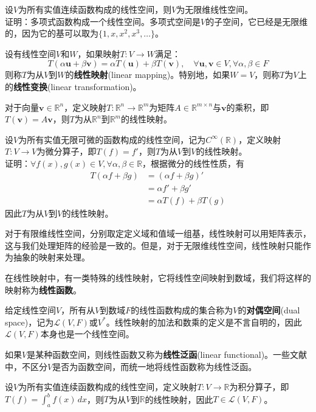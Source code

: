 \begin{example}
    设$V$为所有实值连续函数构成的线性空间，则$V$为无限维线性空间。\\
    证明：多项式函数构成一个线性空间。多项式空间是$V$的子空间，它已经是无限维的，因为它的基可以取为$\{1,x,x^2,x^3,\ldots\}$。
\end{example}

\begin{definition}[线性映射]
    设有线性空间$V$和$W$，如果映射$T:V\to W$满足：
    \[T(\alpha \mathbf{u}+\beta \mathbf{v})=\alpha T(\mathbf{u})+\beta T(\mathbf{v}),\quad\forall \mathbf{u},\mathbf{v}\in V,\forall \alpha,\beta\in F\]
    则称$T$为从$V$到$W$的\textbf{线性映射}(linear mapping)。特别地，如果$W=V$，则称$T$为$V$上的\textbf{线性变换}(linear transformation)。
\end{definition}

\begin{example}
    对于向量$\mathbf{v}\in\mathbb{R}^n$，定义映射$T:\mathbb{R}^n\to\mathbb{R}^m$为矩阵$A\in\mathbb{R}^{m\times n}$与$\mathbf{v}$的乘积，即$T(\mathbf{v})=A\mathbf{v}$，则$T$为从$\mathbb{R}^n$到$\mathbb{R}^m$的线性映射。
\end{example}

\begin{example}
    设$V$为所有实值无限可微的函数构成的线性空间，记为$C^\infty(\mathbb{R})$，定义映射$T:V\to V$为微分算子，即$T(f)=f'$，则$T$为从$V$到$V$的线性映射。\\
    证明：$\forall f(x),g(x)\in V,\forall \alpha,\beta\in \mathbb{R}$，根据微分的线性性质，有
    \begin{align*}
        T(\alpha f+\beta g)&=(\alpha f+\beta g)'\\
        &=\alpha f'+\beta g'\\
        &=\alpha T(f)+\beta T(g)
    \end{align*}
    因此$T$为从$V$到$V$的线性映射。
\end{example}

对于有限维线性空间，分别取定定义域和值域一组基，线性映射可以用矩阵表示，这与我们处理矩阵的经验是一致的。但是，对于无限维线性空间，线性映射只能作为抽象的映射来处理。

在线性映射中，有一类特殊的线性映射，它将线性空间映射到数域，我们将这样的映射称为\textbf{线性函数}。

\begin{definition}[对偶空间]
    给定线性空间$V$，所有从$V$到数域$F$的线性函数构成的集合称为$V$的\textbf{对偶空间}(dual space)，记为$\mathcal{L} (V,F)$或$V^*$。线性映射的加法和数乘的定义是不言自明的，因此$\mathcal{L} (V,F)$本身也是一个线性空间。

    如果$V$是某种函数空间，则线性函数又称为\textbf{线性泛函}(linear functional)。一些文献中，不区分$V$是否为函数空间，而统一地将线性函数称为线性泛函。
\end{definition}
\begin{example}
    设$V$为所有实值连续函数构成的线性空间，定义映射$T:V\to \mathbb{R}$为积分算子，即$T(f)=\int_{a}^{b}f(x)\,dx$，则$T$为从$V$到$\mathbb{R}$的线性映射，因此$T\in \mathcal{L} (V,F)$。
\end{example}

